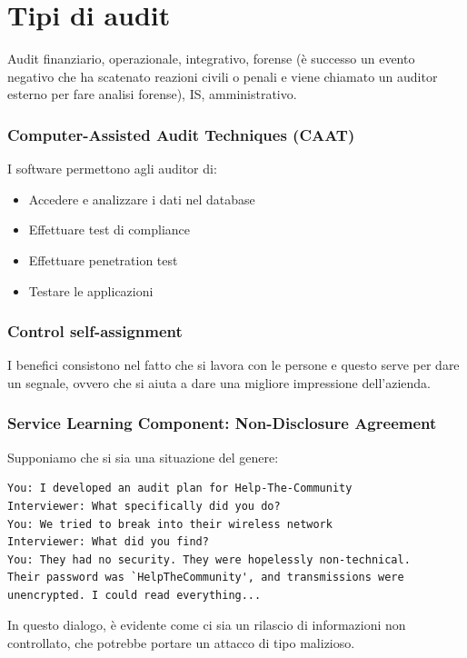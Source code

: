 \section{Tipi di audit}

Audit finanziario, operazionale, integrativo, forense (è successo un evento negativo che ha scatenato reazioni civili o penali e viene chiamato un auditor esterno per fare analisi forense), IS, amministrativo.

\subsubsection{Computer-Assisted Audit Techniques (CAAT)}

I software permettono agli auditor di:
\begin{itemize}
\item Accedere e analizzare i dati nel database
\item Effettuare test di compliance
\item Effettuare penetration test
\item Testare le applicazioni
\end{itemize}


\subsubsection{Control self-assignment}
I benefici consistono nel fatto che si lavora con le persone e questo serve per dare un segnale, ovvero che si aiuta a dare una migliore impressione dell'azienda.



\subsubsection{Service Learning Component: Non-Disclosure Agreement}

Supponiamo che si sia una situazione del genere:

\begin{verbatim}
You: I developed an audit plan for Help-The-Community
Interviewer: What specifically did you do?
You: We tried to break into their wireless network
Interviewer: What did you find?
You: They had no security. They were hopelessly non-technical.
Their password was `HelpTheCommunity', and transmissions were
unencrypted. I could read everything...
\end{verbatim}

In questo dialogo, è evidente come ci sia un rilascio di informazioni non controllato, che potrebbe portare un attacco di tipo malizioso.





